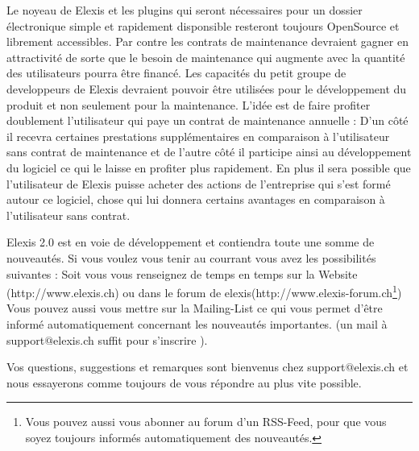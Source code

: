 \documentclass[a4paper]{scrartcl}
\begin{document}
Le noyeau de Elexis et les plugins qui seront nécessaires pour un dossier électronique simple et rapidement disponsible resteront toujours OpenSource et librement accessibles. Par contre les contrats de maintenance devraient gagner en attractivité de sorte que le besoin de maintenance qui augmente avec la quantité des utilisateurs  pourra être financé. Les capacités du petit groupe de developpeurs de Elexis devraient pouvoir être utilisées pour le développement du produit et non seulement pour la maintenance. L'idée est de faire profiter doublement l'utilisateur qui paye un contrat de maintenance annuelle : D'un côté il recevra certaines prestations supplémentaires en comparaison à l'utilisateur sans contrat de maintenance et de l'autre côté il participe ainsi au développement du logiciel ce qui le laisse en profiter plus rapidement. En plus il sera possible que l'utilisateur de Elexis puisse acheter des actions de l'entreprise qui s'est formé autour ce logiciel, chose qui lui donnera certains avantages en comparaison à l'utilisateur sans contrat. 
\medskip

Elexis 2.0 est en voie de développement et contiendra toute une somme de nouveautés. Si vous voulez vous tenir au courrant vous avez les possibilités suivantes : Soit vous vous renseignez de temps en temps sur la Website (http://www.elexis.ch) ou dans le  forum de elexis(http://www.elexis-forum.ch\footnote{Vous pouvez aussi vous abonner au forum d'un RSS-Feed, pour que vous soyez toujours informés automatiquement des nouveautés.}) Vous pouvez aussi vous mettre sur la Mailing-List ce qui vous permet d'être informé automatiquement concernant les nouveautés importantes. (un mail à support$@$elexis.ch suffit pour s'inscrire ).

\medskip

Vos questions, suggestions et remarques sont bienvenus chez support$@$elexis.ch et nous essayerons comme toujours de vous répondre au plus vite possible.
\end{document}
